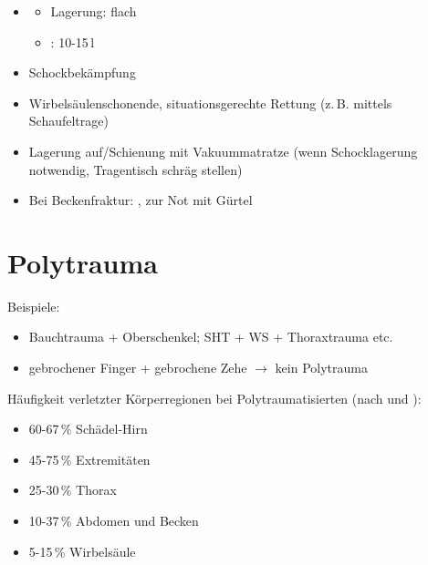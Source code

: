{
\begin{itemize}
  \item \TxMassVitBes
  \begin{itemize}
    \item Lagerung: flach
    \item {}: 10-15\,l
  \end{itemize}
  \item Schockbekämpfung
  \item Wirbelsäulenschonende, situationsgerechte Rettung (z.\,B. mittels
  Schaufeltrage)
  \item Lagerung auf/Schienung mit Vakuummatratze (wenn Schocklagerung notwendig, Tragentisch schräg stellen)
  \item Bei Beckenfraktur:
  , zur Not mit
  Gürtel
\end{itemize}
}


\clearpage
\section{Polytrauma}
\label{topic:polytrauma}



Beispiele:
\begin{itemize}
  \item Bauchtrauma + Oberschenkel; SHT + WS + Thoraxtrauma etc.
  \item gebrochener Finger + gebrochene Zehe ${\rightarrow}$ kein
  Polytrauma
\end{itemize}

Häufigkeit verletzter Körperregionen bei Polytraumatisierten (nach
\cite{BoehmerTaschRett6} und \cite{Gorgass7}):
\begin{itemize}
  \item 60-67\,\% Schädel-Hirn
  \item 45-75\,\% Extremitäten
  \item 25-30\,\% Thorax
  \item 10-37\,\% Abdomen und Becken
  \item 5-15\,\% Wirbelsäule
\end{itemize}

